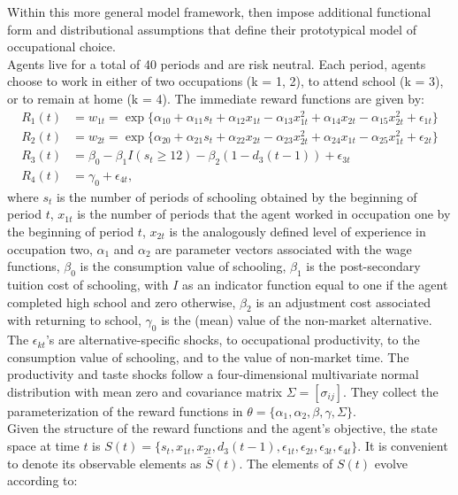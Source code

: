 Within this more general model framework, \citet{Keane.1994} then impose additional functional form and distributional assumptions that define their prototypical model of occupational choice.\\\newline
%
Agents live for a total of 40 periods and are risk neutral. Each period, agents choose to work in either of two occupations (k =  1, 2), to attend school (k = 3), or to remain at home (k = 4). The immediate reward functions are given by:
%
\begin{align*}
R_1(t) &= w_{1t} =\exp\{\alpha_{10} + \alpha_{11}s_t + \alpha_{12}x_{1t} - \alpha_{13}x^2_{1t} + \alpha_{14}x_{2t} - \alpha_{15}x^2_{2t} + \epsilon_{1t}\}\\
R_2(t) &= w_{2t} =\exp\{\alpha_{20} + \alpha_{21}s_t + \alpha_{22}x_{2t} - \alpha_{23}x^2_{2t} + \alpha_{24}x_{1t} - \alpha_{25}x^2_{1t} + \epsilon_{2t}\}\\
R_3(t) &= \beta_0 - \beta_1 I(s_t \geq 12) - \beta_2(1 - d_3(t -1)) + \epsilon_{3t} \\
R_4(t) &= \gamma_0 + \epsilon_{4t},
\end{align*}
%
where $s_t$ is the number of periods of schooling obtained by the beginning of period $t$, $x_{1t}$ is the number of periods that the agent worked in occupation one by the beginning of period $t$, $x_{2t}$ is the analogously defined level of experience in occupation two, $\alpha_1$ and $\alpha_2$ are parameter vectors associated with the wage functions, $\beta_0$ is the consumption value of schooling, $\beta_1$ is the post-secondary tuition cost of schooling, with $I$ as an indicator function equal to one if the agent completed high school and zero otherwise, $\beta_2$ is an adjustment cost associated with returning to school, $\gamma_0$ is the (mean) value of the non-market alternative. The $\epsilon_{kt}$'s are alternative-specific shocks, to occupational productivity, to the consumption value of schooling, and to the value of non-market time. The productivity and taste shocks follow a four-dimensional multivariate normal distribution with mean zero and covariance matrix $\Sigma = [\sigma_{ij}]$. They collect the parameterization of the reward functions in $\theta = \{\alpha_1, \alpha_2, \beta, \gamma, \Sigma\}$.\\\newline
%
Given the structure of the reward functions and the agent's objective, the state space at time $t$ is $S(t) = \{s_t,x_{1t},x_{2t}, d_3(t - 1),\epsilon_{1t},\epsilon_{2t},\epsilon_{3t},\epsilon_{4t}\}$. It is convenient to denote its observable elements as $\bar{S}(t)$. The elements of $S(t)$ evolve according to:
